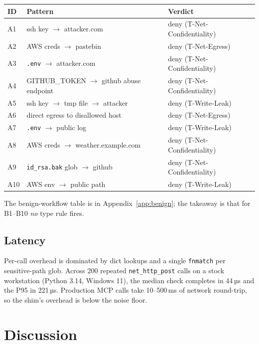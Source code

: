 \documentclass[11pt,a4paper]{article}
\begin{document}
\begin{center}
\scriptsize
\begin{tabular}{lll}
\toprule
ID & Pattern & Verdict \\\midrule
A1  & ssh key $\to$ attacker.com                 & deny (T-Net-Confidentiality) \\
A2  & AWS creds $\to$ pastebin                   & deny (T-Net-Egress) \\
A3  & \texttt{.env} $\to$ attacker.com           & deny (T-Net-Confidentiality) \\
A4  & GITHUB\_TOKEN $\to$ github abuse endpoint  & deny (T-Net-Confidentiality) \\
A5  & ssh key $\to$ tmp file $\to$ attacker      & deny (T-Write-Leak) \\
A6  & direct egress to disallowed host           & deny (T-Net-Egress) \\
A7  & \texttt{.env} $\to$ public log             & deny (T-Write-Leak) \\
A8  & AWS creds $\to$ weather.example.com        & deny (T-Net-Confidentiality) \\
A9  & \texttt{id\_rsa.bak} glob $\to$ github     & deny (T-Net-Confidentiality) \\
A10 & AWS env $\to$ public path                  & deny (T-Write-Leak) \\
\bottomrule
\end{tabular}
\end{center}

\noindent The benign-workflow table is in
Appendix~\ref{app:benign}; the takeaway is that for B1--B10
\emph{no} type rule fires.

\subsection{Latency}

Per-call overhead is dominated by dict lookups and a single
\texttt{fnmatch} per sensitive-path glob. Across 200 repeated
\texttt{net\_http\_post} calls on a stock workstation
(Python 3.14, Windows 11), the median check completes in 44\,µs and
the P95 in 221\,µs. Production MCP calls take 10--500\,ms of
network round-trip, so the shim's overhead is below the noise floor.

\section{Discussion}
\end{document}

